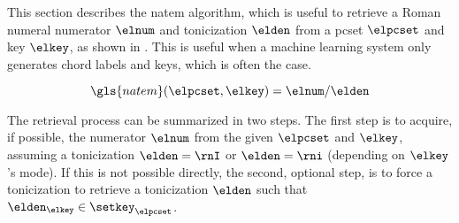 
This section describes the \gls{natem} algorithm, which is
useful to retrieve a Roman numeral numerator $\elnum$ and
tonicization $\elden$ from a \gls{pcset} $\elpcset$ and key
$\elkey$, as shown in . This is useful when a
machine learning system only generates chord labels and
keys, which is often the case. 

\begin{equation}
    \label{eq:natem}
    \gls{natem}(\elpcset, \elkey) = \elnum\text{/}\elden
\end{equation}

The retrieval process can be summarized in two steps. The
first step is to acquire, if possible, the numerator
$\elnum$ from the given $\elpcset$ and $\elkey$, assuming a
tonicization $\elden = \rnI$ or $\elden = \rni$ (depending
on $\elkey$'s mode). If this is not possible directly, the
second, optional step, is to force a tonicization to
retrieve a tonicization $\elden$ such that $\elden_\elkey
\in \setkey_\elpcset$.


